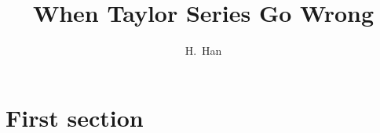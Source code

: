 \documentclass{beamer}
\title[When Taylor Series Go Wrong] %
{When Taylor Series Go Wrong}
\author[H.~Han]
{H.~Han}
\begin{document}
\frame{\titlepage}




\section{First section}

%



%
%

\end{document}

